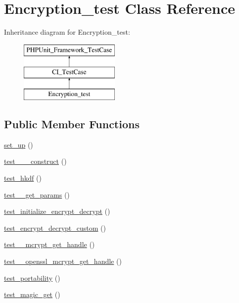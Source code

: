 \hypertarget{class_encryption__test}{}\section{Encryption\+\_\+test Class Reference}
\label{class_encryption__test}
Inheritance diagram for Encryption\+\_\+test\+:\begin{figure}[H]
\begin{center}
\leavevmode
\includegraphics[height=3.000000cm]{class_encryption__test}
\end{center}
\end{figure}
\subsection*{Public Member Functions}
\begin{DoxyCompactItemize}
\item 
\hyperlink{class_encryption__test_a69829875c8d4b6ce94908445c4155741}{set\+\_\+up} ()
\item 
\hyperlink{class_encryption__test_a96ead382f67665953161cfc9c10cb87c}{test\+\_\+\+\_\+\+\_\+construct} ()
\item 
\hyperlink{class_encryption__test_a7ef49b77748a53ba23bd5eb8c4dc832a}{test\+\_\+hkdf} ()
\item 
\hyperlink{class_encryption__test_af3d6309f1cf254bbfef02bf2d916f3fd}{test\+\_\+\+\_\+get\+\_\+params} ()
\item 
\hyperlink{class_encryption__test_af11ca961bd5fdeeb2cdb780543effd5f}{test\+\_\+initialize\+\_\+encrypt\+\_\+decrypt} ()
\item 
\hyperlink{class_encryption__test_a01403cd763b7106309e356ad77be6bf7}{test\+\_\+encrypt\+\_\+decrypt\+\_\+custom} ()
\item 
\hyperlink{class_encryption__test_a798446a18e35f0c2b6d68edff4440c0f}{test\+\_\+\+\_\+mcrypt\+\_\+get\+\_\+handle} ()
\item 
\hyperlink{class_encryption__test_a40c8c9b84ab74ce644f3167699cb737c}{test\+\_\+\+\_\+openssl\+\_\+mcrypt\+\_\+get\+\_\+handle} ()
\item 
\hyperlink{class_encryption__test_af03f31fa5da94f995a598c45a9aae0a4}{test\+\_\+portability} ()
\item 
\hyperlink{class_encryption__test_ae4e05a6463fa26483d2ebd63c623efd5}{test\+\_\+magic\+\_\+get} ()
\end{DoxyCompactItemize}
